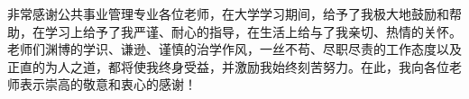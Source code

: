 

\begin{acknowledgement}

非常感谢公共事业管理专业各位老师，在大学学习期间，给予了我极大地鼓励和帮助，在学习上给予了我严谨、耐心的指导，在生活上给与了我亲切、热情的关怀。老师们渊博的学识、谦逊、谨慎的治学作风，一丝不苟、尽职尽责的工作态度以及正直的为人之道，都将使我终身受益，并激励我始终刻苦努力。在此，我向各位老师表示崇高的敬意和衷心的感谢！

\end{acknowledgement}

